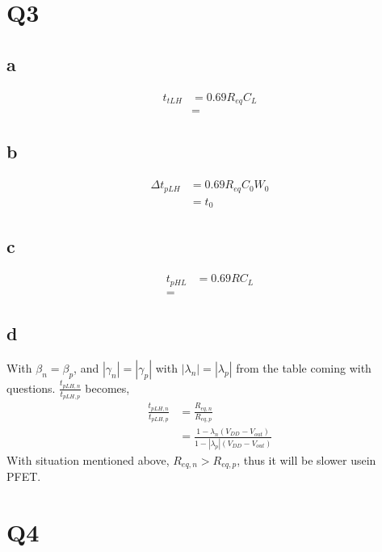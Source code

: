 \documentclass[a4paper,10pt]{article}
\begin{document}
\section*{Q3}
\subsection*{a}
\begin{equation}
\begin{split}
t_{tLH} &= 0.69R_{eq}C_L\\
&=
\end{split}
\end{equation}
\subsection*{b}
\begin{equation}
\begin{split}
\Delta t_{pLH} &= 0.69R_{eq}C_0 W_0\\
&= t_0
\end{split}
\end{equation}
\subsection*{c}
\begin{equation}
\begin{split}
t_{pHL} &= 0.69RC_L\\
=
\end{split}
\end{equation}
\subsection*{d}
With \begin{math}\beta_n = \beta_p\end{math}, and \begin{math}|\gamma_n| = |\gamma_p|\end{math} with 
\begin{math}|\lambda_n| = |\lambda_p|\end{math} from the table coming with questions.
\begin{math}\frac{t_{pLH, n}}{t_{pLH, p}}\end{math} becomes,
\begin{equation}
 \begin{split}
  \frac{t_{pLH, n}}{t_{pLH, p}} &= \frac{R_{eq, n}}{R_{eq, p}} \\
  &= \frac{1 - \lambda_n (V_{DD} - V_{out})}{1-|\lambda_p|(V_{DD} - V_{out})}
 \end{split}
\end{equation}
With situation mentioned above, \begin{math}R_{eq, n} > R_{eq, p}\end{math}, thus it will be slower usein PFET.
\section*{Q4}
\end{document}
